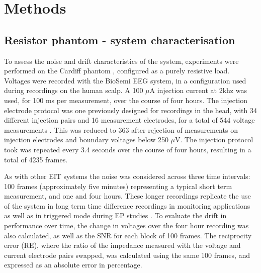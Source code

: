 \section{Methods}
\subsection{Resistor phantom - system characterisation}

To assess the noise and drift characteristics of the system, experiments were performed on the Cardiff phantom \cite{griffiths1995cole}, configured as a purely resistive load. Voltages were recorded with the BioSemi EEG system, in a configuration used during recordings on the human scalp. A 100 $\mu$A injection current at 2khz was used, for 100 ms per measurement, over the course of four hours. The injection electrode protocol was one previously designed for recordings in the head, with 34 different injection pairs and 16 measurement electrodes, for a total of 544 voltage measurements \cite{Fabrizi2009}. This was reduced to 363 after rejection of measurements on injection electrodes and boundary voltages below 250 $\mu$V. The injection protocol took was repeated every 3.4 seconds over the course of four hours, resulting in a total of 4235 frames. 

As with other EIT systems \cite{oh2007multi} the noise was considered across three time intervals: 100 frames (approximately five minutes) representing a typical short term measurement, and one and four hours. These longer recordings replicate the use of the system in long term time difference recordings in monitoring applications \cite{fu2014use} \cite{adler2012whither} as well as in triggered mode during EP studies \cite{Aristovich_2016}. To evaluate the drift in performance over time, the change in voltages over the four hour recording was also calculated, as well as the SNR for each block of 100 frames. The reciprocity error (RE), where the ratio of the impedance measured with the voltage and current electrode pairs swapped, was calculated using the same 100 frames, and expressed as an absolute error in percentage.

